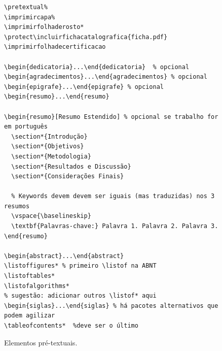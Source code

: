 \documentclass[embeddedlogo]{ufsc-thesis-rn46-2019}
\begin{document}
\begin{figure}[tb]
  \centering
  \caption{Elementos pré-textuais.}
  \label{fig:pre}
  \begin{verbatim}
\pretextual%
\imprimircapa%
\imprimirfolhaderosto*
\protect\incluirfichacatalografica{ficha.pdf}
\imprimirfolhadecertificacao

\begin{dedicatoria}...\end{dedicatoria}  % opcional
\begin{agradecimentos}...\end{agradecimentos} % opcional
\begin{epigrafe}...\end{epigrafe} % opcional
\begin{resumo}...\end{resumo} 

\begin{resumo}[Resumo Estendido] % opcional se trabalho for em português
  \section*{Introdução}
  \section*{Objetivos} 
  \section*{Metodologia} 
  \section*{Resultados e Discussão} 
  \section*{Considerações Finais} 

  % Keywords devem devem ser iguais (mas traduzidas) nos 3 resumos  
  \vspace{\baselineskip}
  \textbf{Palavras-chave:} Palavra 1. Palavra 2. Palavra 3. 
\end{resumo}

\begin{abstract}...\end{abstract}
\listoffigures* % primeiro \listof na ABNT
\listoftables*  
\listofalgorithms*
% sugestão: adicionar outros \listof* aqui
\begin{siglas}...\end{siglas} % há pacotes alternativos que podem agilizar
\tableofcontents*  %deve ser o último
  \end{verbatim}
\end{figure}
\end{document}
